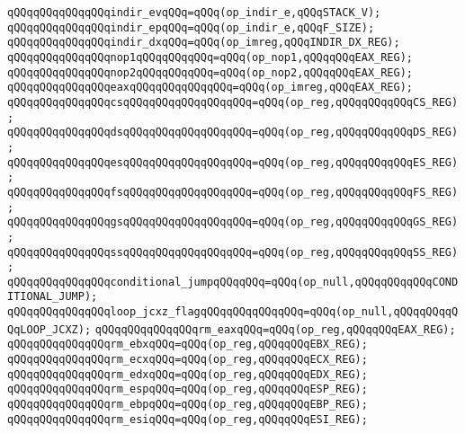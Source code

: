 \verb|qQQqqQQqqQQqqQQqindir_evqQQq=qQQq(op_indir_e,qQQqSTACK_V);|\newline
\verb|qQQqqQQqqQQqqQQqindir_epqQQq=qQQq(op_indir_e,qQQqF_SIZE);|\newline
\verb|qQQqqQQqqQQqqQQqindir_dxqQQq=qQQq(op_imreg,qQQqINDIR_DX_REG);|\newline
\newline
\verb|qQQqqQQqqQQqqQQqnop1qQQqqQQqqQQq=qQQq(op_nop1,qQQqqQQqEAX_REG);|\newline
\verb|qQQqqQQqqQQqqQQqnop2qQQqqQQqqQQq=qQQq(op_nop2,qQQqqQQqEAX_REG);|\newline
\verb|qQQqqQQqqQQqqQQqeaxqQQqqQQqqQQqqQQq=qQQq(op_imreg,qQQqEAX_REG);|\newline
\verb|qQQqqQQqqQQqqQQqcsqQQqqQQqqQQqqQQqqQQq=qQQq(op_reg,qQQqqQQqqQQqCS_REG);|\newline
\verb|qQQqqQQqqQQqqQQqdsqQQqqQQqqQQqqQQqqQQq=qQQq(op_reg,qQQqqQQqqQQqDS_REG);|\newline
\verb|qQQqqQQqqQQqqQQqesqQQqqQQqqQQqqQQqqQQq=qQQq(op_reg,qQQqqQQqqQQqES_REG);|\newline
\verb|qQQqqQQqqQQqqQQqfsqQQqqQQqqQQqqQQqqQQq=qQQq(op_reg,qQQqqQQqqQQqFS_REG);|\newline
\verb|qQQqqQQqqQQqqQQqgsqQQqqQQqqQQqqQQqqQQq=qQQq(op_reg,qQQqqQQqqQQqGS_REG);|\newline
\verb|qQQqqQQqqQQqqQQqssqQQqqQQqqQQqqQQqqQQq=qQQq(op_reg,qQQqqQQqqQQqSS_REG);|\newline
\verb|qQQqqQQqqQQqqQQqconditional_jumpqQQqqQQq=qQQq(op_null,qQQqqQQqqQQqCONDITIONAL_JUMP);|\newline
\verb|qQQqqQQqqQQqqQQqloop_jcxz_flagqQQqqQQqqQQqqQQq=qQQq(op_null,qQQqqQQqqQQqLOOP_JCXZ);|\newline
\newline
\verb|qQQqqQQqqQQqqQQqrm_eaxqQQq=qQQq(op_reg,qQQqqQQqEAX_REG);|\newline
\verb|qQQqqQQqqQQqqQQqrm_ebxqQQq=qQQq(op_reg,qQQqqQQqEBX_REG);|\newline
\verb|qQQqqQQqqQQqqQQqrm_ecxqQQq=qQQq(op_reg,qQQqqQQqECX_REG);|\newline
\verb|qQQqqQQqqQQqqQQqrm_edxqQQq=qQQq(op_reg,qQQqqQQqEDX_REG);|\newline
\verb|qQQqqQQqqQQqqQQqrm_espqQQq=qQQq(op_reg,qQQqqQQqESP_REG);|\newline
\verb|qQQqqQQqqQQqqQQqrm_ebpqQQq=qQQq(op_reg,qQQqqQQqEBP_REG);|\newline
\verb|qQQqqQQqqQQqqQQqrm_esiqQQq=qQQq(op_reg,qQQqqQQqESI_REG);|\newline

